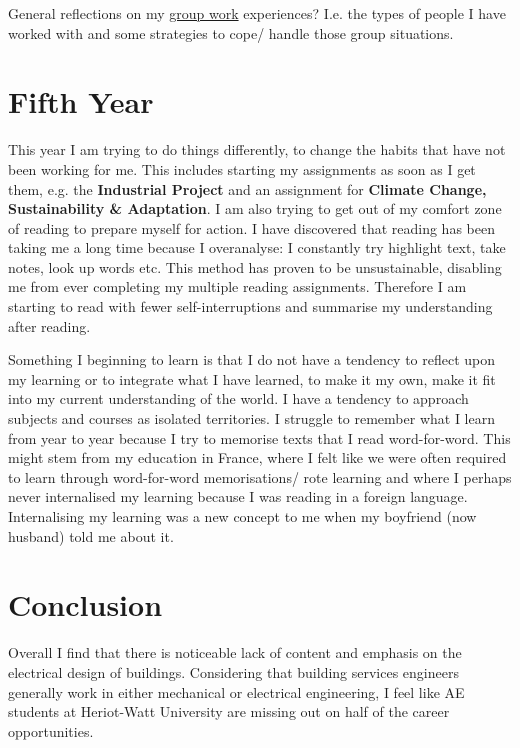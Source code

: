 General reflections on my \underline{group work} experiences?
I.e. the types of people I have worked with and some strategies to cope/ handle those group situations.




\section{Fifth Year}

This year I am trying to do things differently, to change the habits that have not been working for me.
This includes starting my assignments as soon as I get them, e.g. the \textbf{Industrial Project} and an assignment for \textbf{Climate Change, Sustainability \& Adaptation}.
I am also trying to get out of my comfort zone of reading to prepare myself for action.
I have discovered that reading has been taking me a long time because I overanalyse: I constantly try highlight text, take notes, look up words etc.
This method has proven to be unsustainable, disabling me from ever completing my multiple reading assignments.
Therefore I am starting to read with fewer self-interruptions and summarise my understanding after reading.

Something I beginning to learn is that I do not have a tendency to reflect upon my learning or to integrate what I have learned, to make it my own, make it fit into my current understanding of the world.
I have a tendency to approach subjects and courses as isolated territories.
I struggle to remember what I learn from year to year because I try to memorise texts that I read word-for-word.
This might stem from my education in France, where I felt like we were often required to learn through word-for-word memorisations/ rote learning and where I perhaps never internalised my learning because I was reading in a foreign language.
Internalising my learning was a new concept to me when my boyfriend (now husband) told me about it.



\section{Conclusion}

Overall I find that there is noticeable lack of content and emphasis on the electrical design of buildings.
Considering that building services engineers generally work in either mechanical or electrical engineering, I feel like AE students at Heriot-Watt University are missing out on half of the career opportunities.